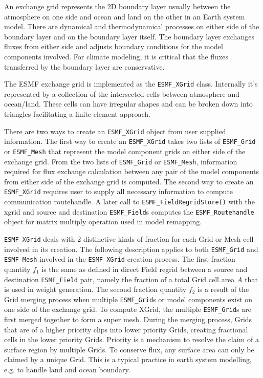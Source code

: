 
\label{sec:xgrid:desc}
An exchange grid represents the 2D boundary layer usually between the
atmosphere on one side and ocean and land on the other in an Earth
system model. There are dynamical and thermodynamical processes on
either side of the boundary layer and on the boundary layer itself.
The boundary layer exchanges fluxes from either side and adjusts
boundary conditions for the model components involved. For climate modeling,
it is critical that the fluxes transferred by the boundary layer are
conservative.

The ESMF exchange grid is implemented as the {\tt ESMF\_XGrid} class. 
Internally it's represented by a collection of the intersected cells
between atmosphere and ocean/land\cite{BalajiXGrid}. These cells can have irregular shapes
and can be broken down into triangles facilitating a finite element
approach. 

There are two ways to create an {\tt ESMF\_XGrid} object from
user supplied information. The first way to create an {\tt ESMF\_XGrid} takes
two lists of {\tt ESMF\_Grid} or {\tt ESMF\_Mesh} that represent the model component grids on
either side of the exchange grid. From the two lists of {\tt ESMF\_Grid} or {\tt ESMF\_Mesh},
information required for flux exchange calculation between any pair of the 
model components from either side of the exchange grid is computed. The second way 
to create an {\tt ESMF\_XGrid} requires user to supply all necessary information 
to compute communication routehandle. A later
call to {\tt ESMF\_FieldRegridStore()} with the xgrid and source and destination
{\tt ESMF\_Field}s computes the {\tt ESMF\_Routehandle} object for matrix
multiply operation used in model remapping. 

{\tt ESMF\_XGrid} deals with 2 distinctive kinds of fraction for each Grid or Mesh cell
involved in its creation. The following description applies to both {\tt ESMF\_Grid} 
and {\tt ESMF\_Mesh} involved in the {\tt ESMF\_XGrid} creation process.
The first fraction quantity $f_1$ is the same as defined in direct
Field regrid between a source and destination {\tt ESMF\_Field} pair, namely the fraction
of a total Grid cell area $A$ that is used in weight generation. The second fraction quantity $f_2$
is a result of the Grid merging process when multiple {\tt ESMF\_Grid}s or model components
exist on one side of the exchange grid. To compute XGrid, the multiple {\tt ESMF\_Grid}s
are first merged together to form a super mesh. During the merging process, Grids that are
of a higher priority clips into lower priority Grids, creating fractional cells in the lower
priority Grids. Priority is a mechanism to resolve the claim of a surface region by multiple
Grids. To conserve flux, any surface area can only be claimed by a unique Grid. This is
a typical practice in earth system modelling, e.g. to handle land and ocean boundary.

